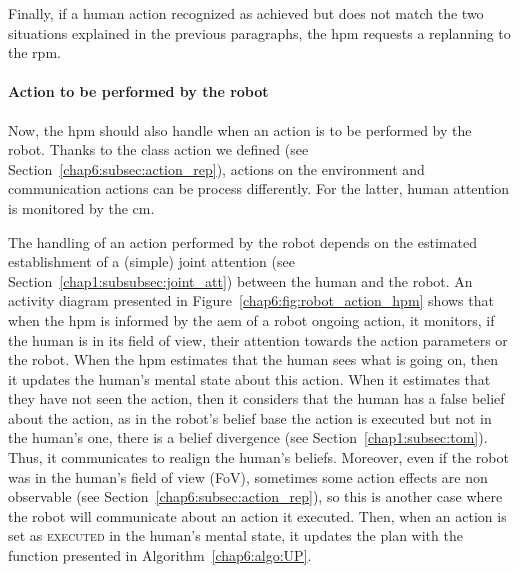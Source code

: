 \documentclass[a4paper,11pt,twoside]{StyleThese}
\begin{document}
Finally, if a human action recognized as achieved but does not match the two situations explained in the previous paragraphs, the \acrshort{hpm} requests a replanning to the \acrshort{rpm}.


\paragraph{Action to be performed by the robot} Now, the \acrshort{hpm} should also handle when an action is to be performed by the robot. Thanks to the class action we defined (see Section~\ref{chap6:subsec:action_rep}), actions on the environment and communication actions can be process differently. For the latter, human attention is monitored by the \acrlong{cm}. 

The handling of an action performed by the robot depends on the estimated establishment of a (simple) joint attention (see Section~\ref{chap1:subsubsec:joint_att}) between the human and the robot. An activity diagram presented in Figure~\ref{chap6:fig:robot_action_hpm} shows that when the \acrshort{hpm} is informed by the \acrfull{aem} of a robot ongoing action, it monitors, if the human is in its field of view, their attention towards the action parameters or the robot. When the \acrshort{hpm} estimates that the human sees what is going on, then it updates the human's mental state about this action. When it estimates that they have not seen the action, then it considers that the human has a false belief about the action, as in the robot's belief base the action is executed but not in the human's one, there is a belief divergence (see Section~\ref{chap1:subsec:tom}). Thus, it communicates to realign the human's beliefs. Moreover, even if the robot was in the human's field of view (FoV), sometimes some action effects are non observable (see Section~\ref{chap6:subsec:action_rep}), so this is another case where the robot will communicate about an action it executed. Then, when an action is set as \textsc{executed} in the human's mental state, it updates the plan with the function presented in Algorithm~\ref{chap6:algo:UP}.
\end{document}

